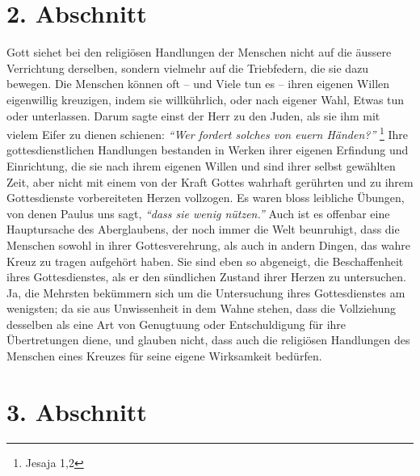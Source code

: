 \section{2. Abschnitt} \label{kap6_ab2}

  Gott siehet bei den religiösen
Handlungen der Menschen nicht auf die äussere
Verrichtung derselben, sondern vielmehr auf die Triebfedern, die sie dazu
bewegen.  Die Menschen können oft -- und Viele
tun es -- ihren eigenen Willen
eigenwillig kreuzigen, indem sie willkührlich, oder nach eigener Wahl, Etwas
tun oder
unterlassen. Darum sagte einst der Herr zu den Juden, als sie ihm
mit vielem
Eifer zu dienen schienen:
\textit{"`Wer fordert solches von euern Händen?"'}
\footnote{Jesaja 1,2}
 Ihre
gottesdienstlichen Handlungen bestanden in Werken ihrer eigenen Erfindung und
Einrichtung, die sie nach ihrem eigenen Willen und sind ihrer selbst gewählten
Zeit, aber nicht mit einem von der Kraft Gottes wahrhaft gerührten und zu ihrem
Gottesdienste vorbereiteten Herzen vollzogen. Es waren bloss leibliche Übungen,
von denen
Paulus uns sagt,
\textit{"`dass sie wenig nützen."'} Auch ist es offenbar eine
Hauptursache des Aberglaubens, der noch
immer die Welt beunruhigt, dass die Menschen sowohl in ihrer Gottesverehrung,
als auch in andern Dingen, das wahre Kreuz zu tragen aufgehört haben. Sie sind
eben so abgeneigt, die Beschaffenheit ihres Gottesdienstes, als er den
sündlichen Zustand ihrer Herzen zu untersuchen. Ja,
die Mehrsten bekümmern sich um die Untersuchung ihres Gottesdienstes am
wenigsten; da sie aus Unwissenheit in
dem Wahne stehen, dass die Vollziehung desselben als eine Art von Genugtuung
oder Entschuldigung für ihre Übertretungen diene, und glauben nicht, dass auch
die religiösen Handlungen des Menschen eines Kreuzes für seine eigene
Wirksamkeit bedürfen.

\section{3. Abschnitt} \label{kap6_ab3}

